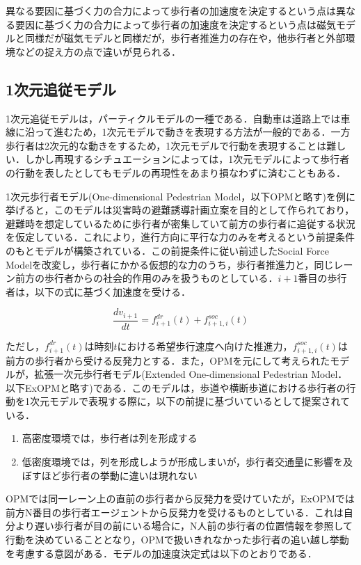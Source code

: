 異なる要因に基づく力の合力によって歩行者の加速度を決定するという点は異なる要因に基づく力の合力によって歩行者の加速度を決定するという点は磁気モデルと同様だが磁気モデルと同様だが，歩行者推進力の存在や，他歩行者と外部環境などの捉え方の点で違いが見られる．

\subsection{1次元追従モデル}

1次元追従モデルは，パーティクルモデルの一種である．自動車は道路上では車線に沿って進むため，1次元モデルで動きを表現する方法が一般的である．一方歩行者は2次元的な動きをするため，1次元モデルで行動を表現することは難しい．しかし再現するシチュエーションによっては，1次元モデルによって歩行者の行動を表したとしてもモデルの再現性をあまり損なわずに済むこともある．

1次元歩行者モデル(One-dimensional Pedestrian Model，以下OPMと略す)\cite{dimension_pedestrian_model}を例に挙げると，このモデルは災害時の避難誘導計画立案を目的として作られており，避難時を想定しているために歩行者が密集していて前方の歩行者に追従する状況を仮定している．これにより，進行方向に平行な力のみを考えるという前提条件のもとモデルが構築されている．この前提条件に従い前述したSocial Force Modelを改変し，歩行者にかかる仮想的な力のうち，歩行者推進力と，同じレーン前方の歩行者からの社会的作用のみを扱うものとしている．$i+1$番目の歩行者は，以下の式に基づく加速度を受ける．

\begin{equation}
 \frac{dv_{i+1}}{dt} = f_{i+1}^{dr}(t) + f_{i+1,i}^{soc}(t)
\end{equation}

ただし，$f_{i+1}^{dr}(t)$は時刻$t$における希望歩行速度へ向けた推進力，$f_{i+1,i}^{soc}(t)$は前方の歩行者から受ける反発力とする．また，OPMを元にして考えられたモデルが，拡張一次元歩行者モデル(Extended One-dimensional Pedestrian Model．以下ExOPMと略す)\cite{exopm}である．このモデルは，歩道や横断歩道における歩行者の行動を1次元モデルで表現する際に，以下の前提に基づいているとして提案されている．

\begin{enumerate}
   \item 高密度環境では，歩行者は列を形成する
   \item 低密度環境では，列を形成しようが形成しまいが，歩行者交通量に影響を及ぼすほど歩行者の挙動に違いは現れない
\end{enumerate}

OPMでは同一レーン上の直前の歩行者から反発力を受けていたが，ExOPMでは前方N番目の歩行者エージェントから反発力を受けるものとしている．これは自分より遅い歩行者が目の前にいる場合に，N人前の歩行者の位置情報を参照して行動を決めていることとなり，OPMで扱いきれなかった歩行者の追い越し挙動を考慮する意図がある．モデルの加速度決定式は以下のとおりである．

